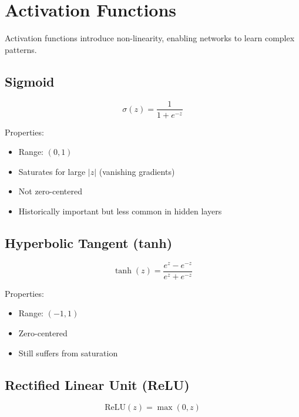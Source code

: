 
\section{Activation Functions}
\label{sec:activation-functions}

Activation functions introduce non-linearity, enabling networks to learn complex patterns.

\subsection{Sigmoid}

\begin{equation}
\sigma(z) = \frac{1}{1 + e^{-z}}
\end{equation}

Properties:
\begin{itemize}
    \item Range: $(0, 1)$
    \item Saturates for large $|z|$ (vanishing gradients)
    \item Not zero-centered
    \item Historically important but less common in hidden layers
\end{itemize}

\subsection{Hyperbolic Tangent (tanh)}

\begin{equation}
\tanh(z) = \frac{e^z - e^{-z}}{e^z + e^{-z}}
\end{equation}

Properties:
\begin{itemize}
    \item Range: $(-1, 1)$
    \item Zero-centered
    \item Still suffers from saturation
\end{itemize}

\subsection{Rectified Linear Unit (ReLU)}

\begin{equation}
\text{ReLU}(z) = \max(0, z)
\end{equation}


